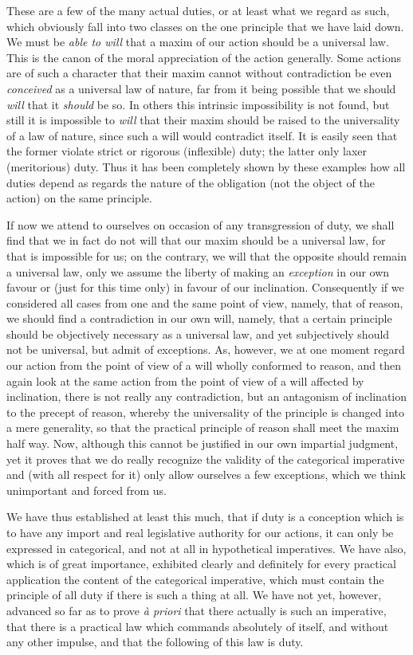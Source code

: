 These are a few of the many actual duties, or at least what we regard
as such, which obviously fall into two classes on the one principle
that we have laid down. We must be \textit{able to will} that a maxim
of our action should be a universal law. This is the canon of the
moral appreciation of the action generally. Some actions are of such a
character that their maxim cannot without contradiction be even
\textit{conceived} as a universal law of nature, far from it being
possible that we should \textit{will} that it \textit{should} be so.
In others this intrinsic impossibility is not  found, but
still it is impossible to \textit{will} that their maxim should be
raised to the universality of a law of nature, since such a will would
contradict itself. It is easily seen that the former violate strict or
rigorous (inflexible) duty; the latter only laxer (meritorious) duty.
Thus it has been completely shown by these examples how all duties
depend as regards the nature of the obligation (not the object of the
action) on the same principle.

If now we attend to ourselves on occasion of any transgression of
duty, we shall find that we in fact do not will that our maxim should
be a universal law, for that is impossible for us; on the contrary, we
will that the opposite should remain a universal law, only we assume
the liberty of making an \textit{exception} in our own favour or (just
for this time only) in favour of our inclination. Consequently if we
considered all cases from one and the same point of view, namely, that
of reason, we should find a contradiction in our own will, namely,
that a certain principle should be objectively necessary as a
universal law, and yet subjectively should not be universal, but admit
of exceptions. As, however, we at one moment regard our action from
the point of view of a will wholly conformed to reason, and then again
look at the same action from the point of view of a will affected by
inclination, there is not really any contradiction, but an antagonism
of inclination to the precept of reason, whereby the universality of
the principle is changed into a mere generality, so that the practical
principle of reason shall meet the maxim half way. Now, although this
cannot be justified in our own impartial judgment, yet it proves that
we do really recognize the validity of the categorical imperative and
(with all respect for it) only allow ourselves a few exceptions, which
we think unimportant and forced from us.

We have thus established at least this much, that if duty is a
conception which is to have any import and real legislative authority
for our actions, it can only be expressed in categorical, and not at
all in hypothetical imperatives. We have also, which is of great
importance, exhibited clearly and definitely for every practical
application the content of the  categorical imperative, which
must contain the principle of all duty if there is such a thing at
all. We have not yet, however, advanced so far as to prove \textit{\`a
priori} that there actually is such an imperative, that there is a
practical law which commands absolutely of itself, and without any
other impulse, and that the following of this law is duty.

